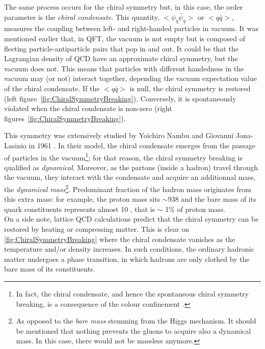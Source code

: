 The same process occurs for the chiral symmetry but, in this case, the order parameter is the \textit{chiral condensate}. This quantity, $< \psi_{q} \bar{\psi}_{q} > $ or $ < q \bar{q} >$, measures the coupling between left- and right-handed particles in vacuum. It was mentioned earlier that, in QFT, the vacuum is not empty but is composed of fleeting particle-antiparticle pairs that pop in and out. It could be that the Lagrangian density of QCD have an approximate chiral symmetry, but the vacuum does not. This means that particles with different handedness in the vacuum may (or not) interact together, depending the vacuum expectation value of the chiral condensate. If the $ < q \bar{q} >$ is null, the chiral symmetry is restored (left figure~\ref{fig:ChiralSymmetryBreaking}). Conversely, it is spontaneously violated when the chiral condensate is non-zero (right figures~\ref{fig:ChiralSymmetryBreaking}).

This symmetry was extensively studied by Yoichiro Nambu and Giovanni Jona-Lasinio in 1961 \cite{nambuDynamicalModelElementary1961}. In their model, the chiral condensate emerges from the passage of particles in the vacuum\footnote{In fact, the chiral condensate, and hence the spontaneous chiral symmetry breaking, is a consequence of the colour confinement \cite{peskinIntroductionQuantumField2018}.}; for that reason, the chiral symmetry breaking is qualified as \textit{dynamical}. Moreover, as the partons (inside a hadron) travel through the vacuum, they interact with the condensate and acquire an additionnal mass, the \textit{dynamical mass}\footnote{As opposed to the \textit{bare mass} stemming from the Higgs mechanism. It should be mentioned that nothing prevents the gluons to acquire also a dynamical mass. In this case, there would not be massless anymore.}. Predominant fraction of the hadron mass originates from this extra mass: for example, the proton mass sits $\sim 938$ \mmass and the bare mass of its quark constituents represents almost 10 \mmass, that is $\sim $ 1\% of proton mass.\\

On a side note, lattice QCD calculations predict that the chiral symmetry can be restored by heating or compressing matter. This is clear on \fig\ref{fig:ChiralSymmetryBreaking} where the chiral condensate vanishes as the temperature and/or density increases. In such conditions, the ordinary hadronic matter undergoes a phase transition, in which hadrons are only clothed by the bare mass of its constituents.

